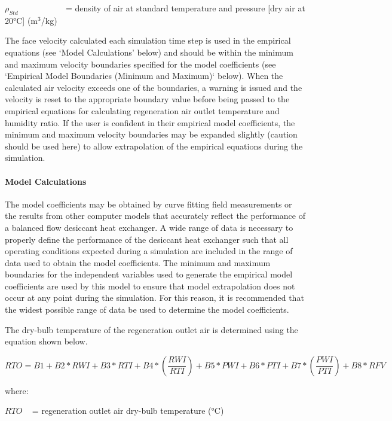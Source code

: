 \({\rho_{Std}}\) ~~~~~~~~~~ = density of air at standard temperature and pressure {[}dry air at 20°C{]} (m\(^{3}\)/kg)

The face velocity calculated each simulation time step is used in the empirical equations (see `Model Calculations' below) and should be within the minimum and maximum velocity boundaries specified for the model coefficients (see `Empirical Model Boundaries (Minimum and Maximum)` below). When the calculated air velocity exceeds one of the boundaries, a warning is issued and the velocity is reset to the appropriate boundary value before being passed to the empirical equations for calculating regeneration air outlet temperature and humidity ratio. If the user is confident in their empirical model coefficients, the minimum and maximum velocity boundaries may be expanded slightly (caution should be used here) to allow extrapolation of the empirical equations during the simulation.

\paragraph{Model Calculations}\label{model-calculations}

The model coefficients may be obtained by curve fitting field measurements or the results from other computer models that accurately reflect the performance of a balanced flow desiccant heat exchanger. A wide range of data is necessary to properly define the performance of the desiccant heat exchanger such that all operating conditions expected during a simulation are included in the range of data used to obtain the model coefficients. The minimum and maximum boundaries for the independent variables used to generate the empirical model coefficients are used by this model to ensure that model extrapolation does not occur at any point during the simulation. For this reason, it is recommended that the widest possible range of data be used to determine the model coefficients.

The dry-bulb temperature of the regeneration outlet air is determined using the equation shown below.

\begin{equation}
RTO = B1 + B2*RWI + B3*RTI + B4*\left( {\frac{{RWI}}{{RTI}}} \right) + B5*PWI + B6*PTI + B7*\left( {\frac{{PWI}}{{PTI}}} \right) + B8*RFV
\end{equation}

where:

\(RTO\) ~ = regeneration outlet air dry-bulb temperature (°C)

